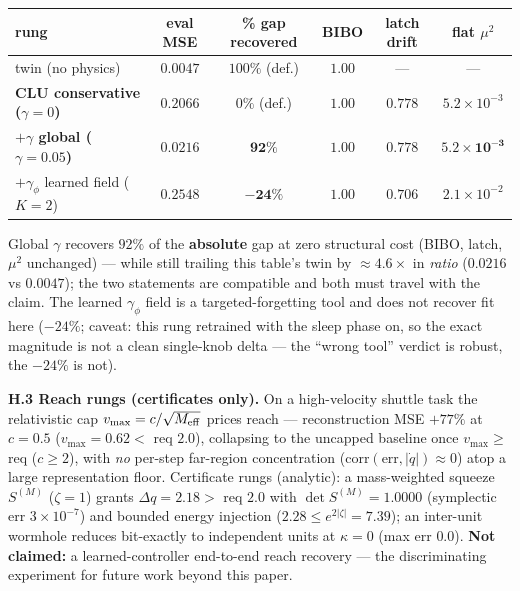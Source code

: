 \documentclass[10pt]{article}
\begin{document}
\begin{center}\small
\begin{tabular}{lccccc}
\toprule
rung & eval MSE & \textbf{\% gap recovered} & BIBO & latch drift & flat $\mu^2$ \\
\midrule
twin (no physics) & $0.0047$ & $100\%$ (def.) & $1.00$ & --- & --- \\
\textbf{CLU conservative ($\gamma=0$)} & $0.2066$ & $0\%$ (def.) & $1.00$ & $0.778$ & $5.2{\times}10^{-3}$ \\
\textbf{$+\gamma$ global ($\gamma=0.05$)} & $0.0216$ & $\mathbf{92\%}$ & $\mathbf{1.00}$ & $\mathbf{0.778}$ & $\mathbf{5.2{\times}10^{-3}}$ \\
$+\gamma_\phi$ learned field ($K=2$) & $0.2548$ & $\mathbf{-24\%}$ & $1.00$ & $0.706$ & $2.1{\times}10^{-2}$ \\
\bottomrule
\end{tabular}
\end{center}
Global $\gamma$ recovers $92\%$ of the \textbf{absolute} gap at zero structural cost (BIBO, latch, $\mu^2$ unchanged) --- while still trailing this table's twin by $\approx4.6\times$ in \emph{ratio} ($0.0216$ vs $0.0047$); the two statements are compatible and both must travel with the claim. The learned $\gamma_\phi$ field is a targeted-forgetting tool and does not recover fit here ($-24\%$; caveat: this rung retrained with the sleep phase on, so the exact magnitude is not a clean single-knob delta --- the ``wrong tool'' verdict is robust, the $-24\%$ is not).

\textbf{H.3 Reach rungs (certificates only).} On a high-velocity shuttle task the relativistic cap $v_{\max}=c/\sqrt{M_{\rm eff}}$ prices reach --- reconstruction MSE $+77\%$ at $c=0.5$ ($v_{\max}=0.62<$ req $2.0$), collapsing to the uncapped baseline once $v_{\max}\ge$ req ($c\ge2$), with \emph{no} per-step far-region concentration ($\mathrm{corr}(\mathrm{err},|\dot q|)\approx0$) atop a large representation floor. Certificate rungs (analytic): a mass-weighted squeeze $S^{(M)}$ ($\zeta=1$) grants $\Delta q=2.18>$ req $2.0$ with $\det S^{(M)}=1.0000$ (symplectic err $3{\times}10^{-7}$) and bounded energy injection ($2.28\le e^{2|\zeta|}=7.39$); an inter-unit wormhole reduces bit-exactly to independent units at $\kappa=0$ (max err $0.0$). \textbf{Not claimed:} a learned-controller end-to-end reach recovery --- the discriminating experiment for future work beyond this paper.
\end{document}
